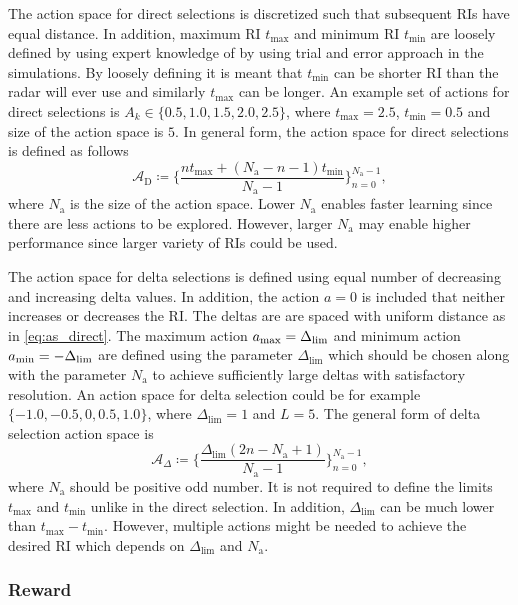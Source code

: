 \documentclass[english, 12pt, a4paper, elec, utf8, a-1b, online]{aaltothesis}
\newcommand{\As}{\mathcal{A}}
\newcommand{\tmax}{t_\text{max}}
\newcommand{\tmin}{t_\text{min}}
\newcommand{\deltalim}{\Delta_\text{lim}}
\newcommand{\Asdir}{\As_\text{D}}
\newcommand{\Asdelta}{\As_\Delta}
\newcommand{\nacts}{{N_\text{a}}}
\begin{document}
The action space for direct selections is discretized such that subsequent RIs have equal distance.
In addition, maximum RI $\tmax$ and minimum RI $\tmin$ are loosely defined by using expert knowledge of by using trial and error approach in the simulations. 
By loosely defining it is meant that $\tmin$ can be shorter RI than the radar will ever use and similarly $\tmax$ can be longer.
An example set of actions for direct selections is $A_k \in \{0.5, 1.0, 1.5, 2.0, 2.5\}$, where $\tmax=2.5$, $\tmin=0.5$ and size of the action space is $5$.
In general form, the action space for direct selections is defined as follows
\begin{equation}\label{eq:as_direct}
    \Asdir \coloneqq \{ \frac{n \tmax + (\nacts-n-1) \tmin}{\nacts-1} \}_{n=0}^{\nacts-1},    
\end{equation}
where $\nacts$ is the size of the action space.
Lower $\nacts$ enables faster learning since there are less actions to be explored.
However, larger $\nacts$ may enable higher performance since larger variety of RIs could be used.

The action space for delta selections is defined using equal number of decreasing and increasing delta values. 
In addition, the action $a=0$ is included that neither increases or decreases the RI.
The deltas are are spaced with uniform distance as in \eqref{eq:as_direct}.
The maximum action $\amax=\deltalim$ and minimum action $\amin=-\deltalim$ are defined using the parameter $\deltalim$ which should be chosen along with the parameter $\nacts$ to achieve sufficiently large deltas with satisfactory resolution.
An action space for delta selection could be for example $\{ -1.0, -0.5, 0, 0.5, 1.0 \}$, where $\deltalim=1$ and $L=5$.
The general form of delta selection action space is
\begin{equation}\label{eq:as_delta}
    \Asdelta \coloneqq \{ \frac{\deltalim \left( 2 n - \nacts + 1 \right)}{\nacts-1} \}_{n=0}^{\nacts-1},
\end{equation}
where $\nacts$ should be positive odd number.
It is not required to define the limits $\tmax$ and $\tmin$ unlike in the direct selection. 
In addition, $\deltalim$ can be much lower than $\tmax - \tmin$.
However, multiple actions might be needed to achieve the desired RI which depends on $\deltalim$ and $\nacts$.

\subsubsection{Reward} \label{sec:rewards}
\end{document}
